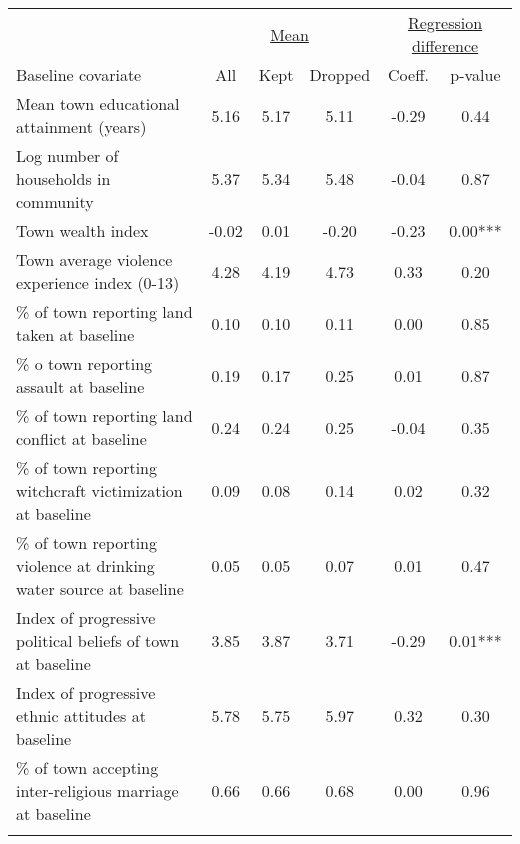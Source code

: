\begin{tabular}{lccccc}
\hline \noalign{\smallskip} & \multicolumn{3}{c}{\uline{\hfill Mean \hfill}} & \multicolumn{2}{c}{\uline{\hfill Regression difference \hfill}}\\
Baseline covariate & All & Kept & Dropped & Coeff. & p-value\\
\noalign{\smallskip}\hline \noalign{\smallskip}Mean town educational attainment (years) & 5.16 & 5.17 & 5.11 & -0.29 & 0.44\\
Log number of households in community & 5.37 & 5.34 & 5.48 & -0.04 & 0.87\\
Town wealth index & -0.02 & 0.01 & -0.20 & -0.23 & 0.00***\\
Town average violence experience index (0-13) & 4.28 & 4.19 & 4.73 & 0.33 & 0.20\\
\% of town reporting land taken at baseline & 0.10 & 0.10 & 0.11 & 0.00 & 0.85\\
\% o town reporting assault at baseline & 0.19 & 0.17 & 0.25 & 0.01 & 0.87\\
\% of town reporting land conflict at baseline & 0.24 & 0.24 & 0.25 & -0.04 & 0.35\\
\% of town reporting witchcraft victimization at baseline & 0.09 & 0.08 & 0.14 & 0.02 & 0.32\\
\% of town reporting violence at drinking water source at baseline & 0.05 & 0.05 & 0.07 & 0.01 & 0.47\\
Index of progressive political beliefs of town at baseline & 3.85 & 3.87 & 3.71 & -0.29 & 0.01***\\
Index of progressive ethnic attitudes at baseline & 5.78 & 5.75 & 5.97 & 0.32 & 0.30\\
\% of town accepting inter-religious marriage at baseline & 0.66 & 0.66 & 0.68 & 0.00 & 0.96\\
\noalign{\smallskip}\hline\end{tabular}

